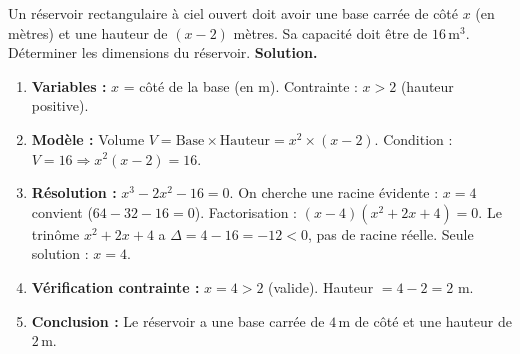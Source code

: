 \documentclass[11pt]{article}
\begin{document}
\begin{exoresolu}
Un réservoir rectangulaire à ciel ouvert doit avoir une base carrée de côté $x$ (en mètres) et une hauteur de $(x-2)$ mètres. Sa capacité doit être de $16\,\text{m}^3$. Déterminer les dimensions du réservoir.
\tcblower
\textbf{Solution.}
\begin{enumerate}
\item \textbf{Variables :} $x$ = côté de la base (en m). Contrainte : $x>2$ (hauteur positive).
\item \textbf{Modèle :} Volume $V = \text{Base} \times \text{Hauteur} = x^2 \times (x-2)$.
Condition : $V=16 \Rightarrow x^2(x-2)=16$.
\item \textbf{Résolution :} $x^3-2x^2-16=0$. On cherche une racine évidente : $x=4$ convient ($64-32-16=0$).
Factorisation : $(x-4)(x^2+2x+4)=0$. Le trinôme $x^2+2x+4$ a $\Delta=4-16=-12<0$, pas de racine réelle.
Seule solution : $x=4$.
\item \textbf{Vérification contrainte :} $x=4 > 2$ (valide). Hauteur $= 4-2=2$ m.
\item \textbf{Conclusion :} Le réservoir a une base carrée de $4\,\text{m}$ de côté et une hauteur de $2\,\text{m}$.
\end{enumerate}
\end{exoresolu}
\end{document}
